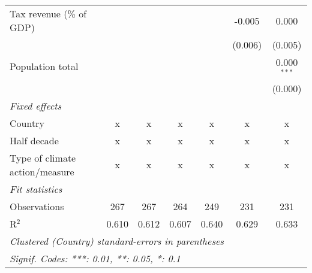 \begin{tabular}{lcccccc}
   Tax revenue (\% of GDP)                            &         &             &             &         & -0.005  & 0.000\\   
                                                      &         &             &             &         & (0.006) & (0.005)\\   
   Population total                                   &         &             &             &         &         & 0.000$^{***}$\\   
                                                      &         &             &             &         &         & (0.000)\\   
   \emph{Fixed effects}\\
   Country                                            & x       & x           & x           & x       & x       & x\\  
   Half decade                                        & x       & x           & x           & x       & x       & x\\  
   Type of climate action/measure                     & x       & x           & x           & x       & x       & x\\  
   \midrule \emph{Fit statistics}\\
   Observations                                       & 267     & 267         & 264         & 249     & 231     & 231\\  
   R$^2$                                              & 0.610   & 0.612       & 0.607       & 0.640   & 0.629   & 0.633\\  
   \midrule
   \multicolumn{7}{l}{\emph{Clustered (Country) standard-errors in parentheses}}\\
   \multicolumn{7}{l}{\emph{Signif. Codes: ***: 0.01, **: 0.05, *: 0.1}}\\
\end{tabular}
\par\endgroup


